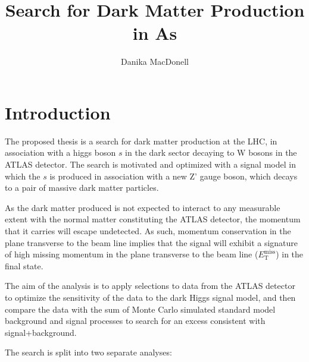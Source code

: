\documentclass[12pt]{article}
\author{Danika MacDonell}
\title{Search for Dark Matter Production in As}
\newcommand*{\met}{\ensuremath{E_\text{T}^\text{miss}}}
\begin{document}
\maketitle

\section{Introduction}

The proposed thesis is a search for dark matter production at the LHC, in association with a higgs boson $s$ in the dark sector decaying to W bosons in the ATLAS detector. The search is motivated and optimized with a signal model in which the $s$ is produced in association with a new Z' gauge boson, which decays to a pair of massive dark matter particles. 

As the dark matter produced is not expected to interact to any measurable extent with the normal matter constituting the ATLAS detector, the momentum that it carries will escape undetected. As such, momentum conservation in the plane transverse to the beam line implies that the signal will exhibit a signature of high missing momentum in the plane transverse to the beam line (\met) in the final state. 

The aim of the analysis is to apply selections to data from the ATLAS detector to optimize the sensitivity of the data to the dark Higgs signal model, and then compare the data with the sum of Monte Carlo simulated standard model background and signal processes to search for an excess consistent with signal+background. 

The search is split into two separate analyses:
\end{document}
